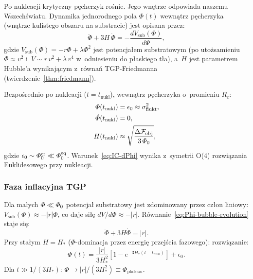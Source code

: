 Po nukleacji krytyczny p\k{e}cherzyk ro\'snie. Jego wn\k{e}trze
odpowiada naszemu Wszech\'swiatu. Dynamika jednorodnego
pola $\Phi(t)$ wewn\k{a}trz p\k{e}cherzyka (wn\k{a}trze kulistego
obszaru na substracie) jest opisana przez:
\begin{equation}\label{eq:Phi-bubble-evolution}
    \ddot{\Phi} + 3H\,\dot{\Phi}
    = -\frac{dV_\mathrm{sub}(\Phi)}{d\Phi},
\end{equation}
gdzie $V_\mathrm{sub}(\Phi) = -r\Phi + \lambda\Phi^2$
jest potencja\l{}em substratowym (po uto\.zsamieniu
$\Phi \approx v^2$ i~$V \sim r\,v^2 + \lambda\,v^4$
w~odniesieniu do p\l{}askiego t\l{}a), a~$H$ jest parametrem
Hubble'a wynikaj\k{a}cym z~r\'owna\'n TGP-Friedmanna
(twierdzenie~\ref{thm:friedmann}).

\begin{proposition}\label{prop:IC-nucleation}
Bezpo\'srednio po nukleacji ($t = t_\mathrm{nukl}$),
wewn\k{a}trz p\k{e}cherzyka o~promieniu $R_c$:
\begin{align}
    \varPhi(t_\mathrm{nukl}) &= \epsilon_0 \approx \sigma^2_{\mathrm{flukt}},
    \label{eq:IC-Phi}\\
    \dot{\varPhi}(t_\mathrm{nukl}) &= 0,
    \label{eq:IC-dPhi}\\
    H(t_\mathrm{nukl}) &\approx \sqrt{\frac{\Delta\mathcal{F}_\mathrm{obj}}{3\,\varPhi_0}},
    \label{eq:IC-H}
\end{align}
gdzie $\epsilon_0 \sim \varPhi_0^{\mathrm{cr}} \ll \varPhi_0^{\mathrm{eq}}$.
Warunek~\eqref{eq:IC-dPhi} wynika z~symetrii O(4)
rozwi\k{a}zania Euklidesowego przy nukleacji.
\end{proposition}

\subsubsection{Faza inflacyjna TGP}

Dla ma\l{}ych $\varPhi \ll \varPhi_0$ potencja\l{} substratowy
jest zdominowany przez cz\l{}on liniowy:
$V_\mathrm{sub}(\Phi) \approx -|r|\Phi$,
co daje si\l{}\k{e} $dV/d\Phi \approx -|r|$.
R\'ownanie~\eqref{eq:Phi-bubble-evolution} staje si\k{e}:
\begin{equation}\label{eq:inflation-eq}
    \ddot\Phi + 3H\dot\Phi = |r|.
\end{equation}
Przy sta\l{}ym $H = H_*$ ($\Phi$-dominacja przez energi\k{e}
przej\'scia fazowego): rozwi\k{a}zanie:
\begin{equation}\label{eq:inflation-sol}
    \Phi(t) = \frac{|r|}{3H_*^2}\!\left[
        1 - e^{-3H_*(t-t_\mathrm{nukl})}
    \right]
    + \epsilon_0.
\end{equation}
Dla $t \gg 1/(3H_*)$: $\Phi \to |r|/(3H_*^2) \equiv \Phi_{\mathrm{plateau}}$.

